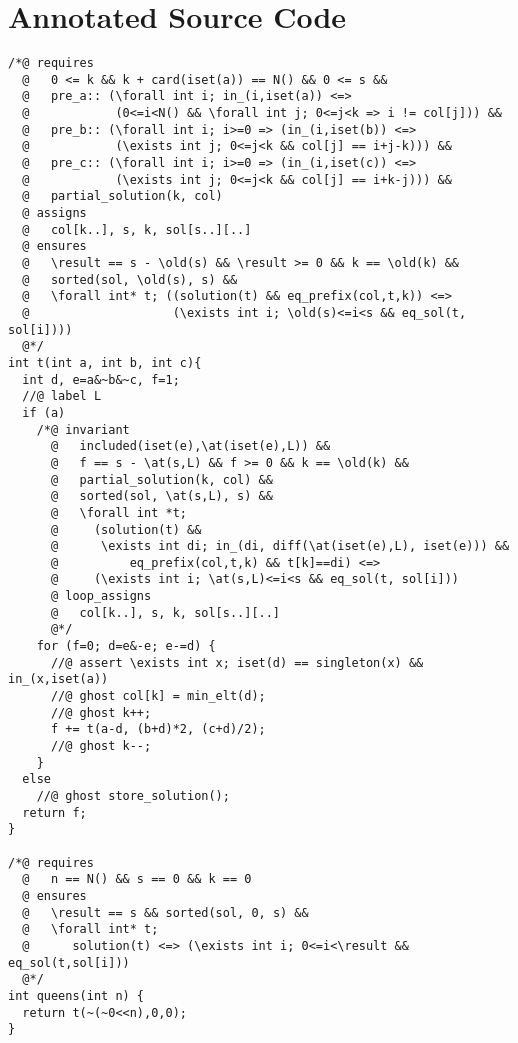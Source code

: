 \documentclass[a4paper]{llncs}
\begin{document}
\section{Annotated Source Code}\label{app:code}
{\footnotesize
\begin{verbatim}
/*@ requires
  @   0 <= k && k + card(iset(a)) == N() && 0 <= s &&
  @   pre_a:: (\forall int i; in_(i,iset(a)) <=> 
  @            (0<=i<N() && \forall int j; 0<=j<k => i != col[j])) &&
  @   pre_b:: (\forall int i; i>=0 => (in_(i,iset(b)) <=> 
  @            (\exists int j; 0<=j<k && col[j] == i+j-k))) &&
  @   pre_c:: (\forall int i; i>=0 => (in_(i,iset(c)) <=> 
  @            (\exists int j; 0<=j<k && col[j] == i+k-j))) &&
  @   partial_solution(k, col)
  @ assigns
  @   col[k..], s, k, sol[s..][..]
  @ ensures  
  @   \result == s - \old(s) && \result >= 0 && k == \old(k) &&
  @   sorted(sol, \old(s), s) &&
  @   \forall int* t; ((solution(t) && eq_prefix(col,t,k)) <=>
  @                    (\exists int i; \old(s)<=i<s && eq_sol(t, sol[i])))
  @*/
int t(int a, int b, int c){
  int d, e=a&~b&~c, f=1;
  //@ label L
  if (a)
    /*@ invariant 
      @   included(iset(e),\at(iset(e),L)) &&
      @   f == s - \at(s,L) && f >= 0 && k == \old(k) && 
      @   partial_solution(k, col) &&
      @   sorted(sol, \at(s,L), s) &&
      @   \forall int *t; 
      @     (solution(t) && 
      @      \exists int di; in_(di, diff(\at(iset(e),L), iset(e))) &&
      @          eq_prefix(col,t,k) && t[k]==di) <=>
      @     (\exists int i; \at(s,L)<=i<s && eq_sol(t, sol[i]))
      @ loop_assigns
      @   col[k..], s, k, sol[s..][..]
      @*/
    for (f=0; d=e&-e; e-=d) {
      //@ assert \exists int x; iset(d) == singleton(x) && in_(x,iset(a)) 
      //@ ghost col[k] = min_elt(d);
      //@ ghost k++;                
      f += t(a-d, (b+d)*2, (c+d)/2);
      //@ ghost k--;                
    }
  else 
    //@ ghost store_solution();
  return f;
}

/*@ requires 
  @   n == N() && s == 0 && k == 0
  @ ensures 
  @   \result == s && sorted(sol, 0, s) &&
  @   \forall int* t; 
  @      solution(t) <=> (\exists int i; 0<=i<\result && eq_sol(t,sol[i]))
  @*/
int queens(int n) {
  return t(~(~0<<n),0,0);
}
\end{verbatim}
}
\end{document}
